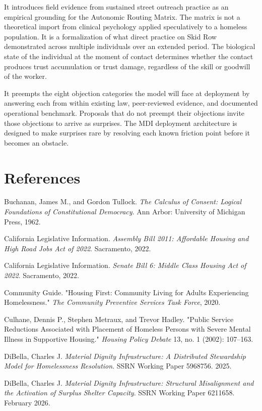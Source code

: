 \documentclass[12pt, letterpaper]{article}
\begin{document}
It introduces field evidence from sustained street outreach practice as an empirical grounding for the Autonomic Routing Matrix. The matrix is not a theoretical import from clinical psychology applied speculatively to a homeless population. It is a formalization of what direct practice on Skid Row demonstrated across multiple individuals over an extended period. The biological state of the individual at the moment of contact determines whether the contact produces trust accumulation or trust damage, regardless of the skill or goodwill of the worker.

It preempts the eight objection categories the model will face at deployment by answering each from within existing law, peer-reviewed evidence, and documented operational benchmark. Proposals that do not preempt their objections invite those objections to arrive as surprises. The MDI deployment architecture is designed to make surprises rare by resolving each known friction point before it becomes an obstacle.


\newpage

\section*{References}

Buchanan, James M., and Gordon Tullock. \textit{The Calculus of Consent: Logical Foundations of Constitutional Democracy}. Ann Arbor: University of Michigan Press, 1962.

California Legislative Information. \textit{Assembly Bill 2011: Affordable Housing and High Road Jobs Act of 2022}. Sacramento, 2022.

California Legislative Information. \textit{Senate Bill 6: Middle Class Housing Act of 2022}. Sacramento, 2022.

Community Guide. "Housing First: Community Living for Adults Experiencing Homelessness." \textit{The Community Preventive Services Task Force}, 2020.

Culhane, Dennis P., Stephen Metraux, and Trevor Hadley. "Public Service Reductions Associated with Placement of Homeless Persons with Severe Mental Illness in Supportive Housing." \textit{Housing Policy Debate} 13, no. 1 (2002): 107–163.

DiBella, Charles J. \textit{Material Dignity Infrastructure: A Distributed Stewardship Model for Homelessness Resolution}. SSRN Working Paper 5968756. 2025.

DiBella, Charles J. \textit{Material Dignity Infrastructure: Structural Misalignment and the Activation of Surplus Shelter Capacity}. SSRN Working Paper 6211658. February 2026.
\end{document}
